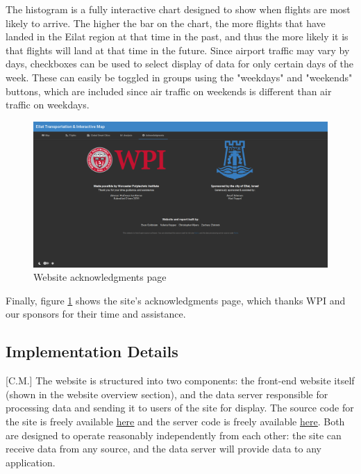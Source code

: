 \documentclass[12pt]{article}                       %
\begin{document}
The histogram is a fully interactive chart designed to show when flights are most likely to arrive. The higher the bar on the chart, the more flights that have landed in the Eilat region at that time in the past, and thus the more likely it is that flights will land at that time in the future. Since airport traffic may vary by days, checkboxes can be used to select display of data for only certain days of the week. These can easily be toggled in groups using the "weekdays" and "weekends" buttons, which are included since air traffic on weekends is different than air traffic on weekdays.

\begin{figure}[H]
    \centering
    \includegraphics[width=13cm]{images/site_about.png}
    \caption{Website acknowledgments page}
    \label{img:site_about}
\end{figure}

Finally, figure \ref{img:site_about} shows the site's acknowledgments page, which thanks WPI and our sponsors for their time and assistance.

\subsection{Implementation Details}[C.M.]
The website is structured into two components: the front-end website itself (shown in the website overview section), and the data server responsible for processing data and sending it to users of the site for display. The source code for the site is freely available \underline{\href{https://github.com/c7c8/Eilat-Transport-Map-Site}{here}} and the server code is freely available \underline{\href{https://github.com/c7c8/Eilat-Transport-Map-Server}{here}}. Both are designed to operate reasonably independently from each other: the site can receive data from any source, and the data server will provide data to any application.
\end{document}
